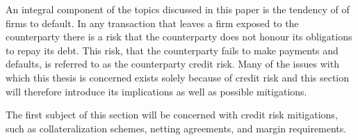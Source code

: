 \documentclass[main.tex]{subfiles}
\begin{document}
    An integral component of the topics discussed in this paper is the tendency of of firms to default.
    In any transaction that leaves a firm exposed to the counterparty
    there is a risk that the counterparty does not honour its obligations to repay its debt.
    This risk, that the counterparty fails to make payments and defaults, 
    is referred to as the counterparty credit risk.
    Many of the issues with which this thesis is concerned exists solely because of credit risk 
    and this section will therefore introduce its implications as well as possible mitigations.

    The first subject of this section will be concerned with credit risk mitigations,
    such as collateralization schemes, netting agreements, and margin requirements.
\end{document}
